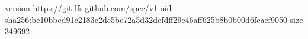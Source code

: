 version https://git-lfs.github.com/spec/v1
oid sha256:be10bbed91c2183c2dc5be72a5d32dcfdff29e46aff625b8b0b00d6fcaef9050
size 349692
